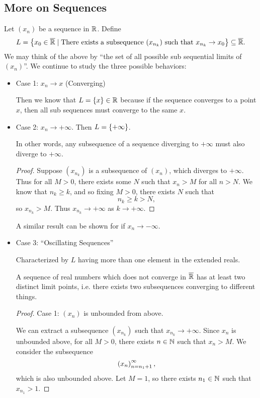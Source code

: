 \documentclass[class=article, crop=false]{standalone}
\begin{document}
  \subsection{More on Sequences}
  Let $(x_n)$ be a sequence in $\mathbb{R}$. Define
  \[
    L = \left\{x_0\in\overline{\mathbb{R}}\mid \text{There exists a subsequence }(x_{n_k})\text{ such that }x_{n_k}\to x_0\right\}\subseteq\overline{\mathbb{R}}.
  \]
  We may think of the above by ``the set of all possible sub sequential limits of $(x_n)$''. We continue to study the three possible behaviors:
  \begin{itemize}
    \item Case 1: $x_n\to x$ (Converging) \par
    Then we know that $L = \left\{x\right\}\in\mathbb{R}$ because if the sequence converges to a point $x$, then all sub sequences must converge to the same $x$.
    \item Case 2: $x_n\to+\infty$. Then $L = \left\{+\infty\right\}$. \par
    In other words, any subsequence of a sequence diverging to $+\infty$ must also diverge to $+\infty$.
    \begin{proof}
      Suppose $(x_{n_k})$ is a subsequence of $(x_n)$, which diverges to $+\infty$. Thus for all $M > 0$, there exists some $N$ such that $x_n > M$ for all $n > N$. We know that $n_k\geq k$, and so fixing $M > 0$, there exists $N$ such that
      \[
        n_k\geq k > N,
      \]
      so $x_{n_k} > M$. Thus $x_{n_k}\to+\infty$ as $k\to+\infty$.
    \end{proof}
    A similar result can be shown for if $x_n\to-\infty$.
    \item Case 3: ``Oscillating Sequences'' \par
    Characterized by $L$ having more than one element in the extended reals.
    \begin{theorem}{3.22}
      A sequence of real numbers which does not converge in $\overline{\mathbb{R}}$ has at least two distinct limit points, i.e. there exists two subsequences converging to different things.
      \begin{proof}
        Case 1: $(x_n)$ is unbounded from above. \par
        We can extract a subsequence $(x_{n_k})$ such that $x_{n_k}\to+\infty$. Since $x_n$ is unbounded above, for all $M > 0$, there exists $n\in\mathbb{N}$ such that $x_n > M$.  We consider the subsequence
        \[
          \left( x_n \right)_{n = n_1 + 1}^{\infty},
        \]
        which is also unbounded above. Let $M = 1$, so there exists $n_1\in\mathbb{N}$ such that $x_{n_1} > 1$.

\end{proof}
\end{theorem}
\end{itemize}
\end{document}
